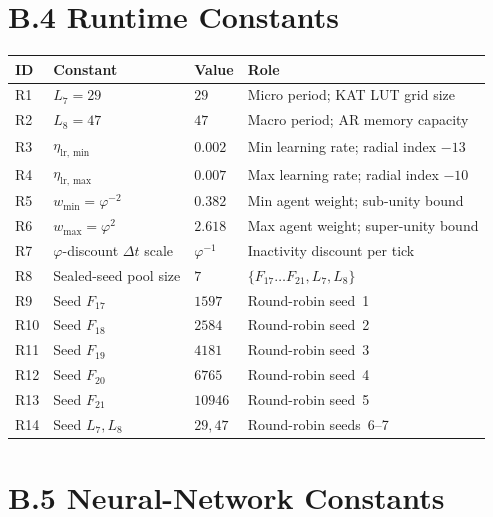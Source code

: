 \section*{B.4 Runtime Constants}
\label{app:B-runtime}

\begin{longtable}[]{@{}llll@{}}
\toprule\noalign{}
ID & Constant & Value & Role \\
\midrule\noalign{}
\endhead
\bottomrule\noalign{}
\endlastfoot
R1 & $L_7 = 29$ & $29$ & Micro period; KAT LUT grid size \\
R2 & $L_8 = 47$ & $47$ & Macro period; AR memory capacity \\
R3 & $\eta_{\mathrm{lr,\,min}}$ & $0.002$ & Min learning rate; radial index $-13$ \\
R4 & $\eta_{\mathrm{lr,\,max}}$ & $0.007$ & Max learning rate; radial index $-10$ \\
R5 & $w_{\min} = \varphi^{-2}$ & $0.382$ & Min agent weight; sub-unity bound \\
R6 & $w_{\max} = \varphi^{2}$ & $2.618$ & Max agent weight; super-unity bound \\
R7 & $\varphi$-discount $\Delta t$ scale & $\varphi^{-1}$ & Inactivity discount per tick \\
R8 & Sealed-seed pool size & $7$ & $\{F_{17}\ldots F_{21}, L_7, L_8\}$ \\
R9 & Seed $F_{17}$ & $1597$ & Round-robin seed~1 \\
R10 & Seed $F_{18}$ & $2584$ & Round-robin seed~2 \\
R11 & Seed $F_{19}$ & $4181$ & Round-robin seed~3 \\
R12 & Seed $F_{20}$ & $6765$ & Round-robin seed~4 \\
R13 & Seed $F_{21}$ & $10946$ & Round-robin seed~5 \\
R14 & Seed $L_7, L_8$ & $29, 47$ & Round-robin seeds~6--7 \\
\end{longtable}

\section*{B.5 Neural-Network Constants}
\label{app:B-neural}

